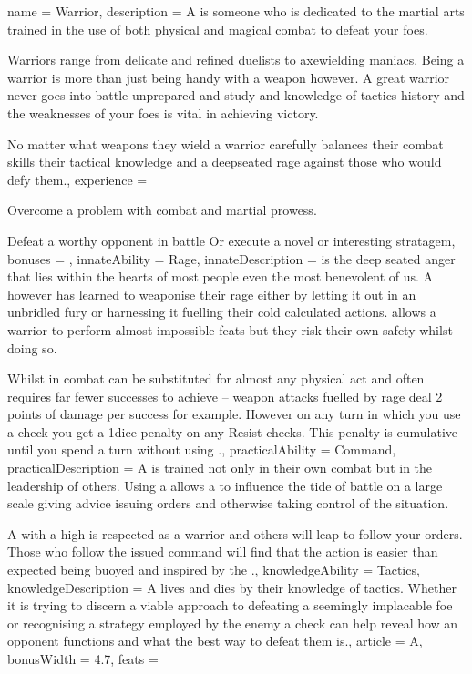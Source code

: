 \archetype
{
	name = Warrior,
	description = A \bname{} is someone who is dedicated to the martial arts\comma{} trained in the use of both physical and magical combat to defeat your foes. 

Warriors range from delicate and refined duelists\comma{} to axe\minus{}wielding maniacs. Being a warrior is more than just being handy with a weapon\comma{} however. A great warrior never goes into battle unprepared\comma{} and study and knowledge of tactics\comma{} history and the weaknesses of your foes is vital in achieving victory. 

No matter what weapons they wield\comma{} a warrior carefully balances their combat skills\comma{} their tactical knowledge and a deep\minus{}seated rage against those who would defy them.,
	experience = \item Overcome a problem with combat and martial prowess.
\item Defeat a worthy opponent in battle
Or execute a novel or interesting stratagem,
	bonuses = 
,
	innateAbility = Rage,
	innateDescription =  is the deep seated anger that lies within the hearts of most people\comma{} even the most benevolent of us. A \bname{}\comma{} however\comma{} has learned to weaponise their rage\comma{} either by letting it out in an unbridled fury\comma{} or harnessing it\comma{} fuelling their cold\comma{} calculated actions.  allows a warrior to perform almost impossible feats\comma{} but they risk their own safety whilst doing so.

Whilst in combat\comma{}  can be substituted for almost any physical act\comma{} and often requires far fewer successes to achieve – weapon attacks fuelled by rage deal 2 points of damage per success\comma{} for example. However\comma{} on any turn in which you use a  check\comma{} you get a 1\minus{}dice penalty on any Resist checks. This penalty is cumulative until you spend a turn without using .,
	practicalAbility = Command,
	practicalDescription = A \bname{} is trained not only in their own combat\comma{} but in the leadership of others. Using a  allows a \bname{} to influence the tide of battle on a large scale\comma{} giving advice\comma{} issuing orders and otherwise taking control of the situation. 

A \bname{} with a high  is respected as a warrior\comma{} and others will leap to follow your orders. Those who follow the issued command will find that the action is easier than expected\comma{} being buoyed and inspired by the .,
	knowledgeAbility = Tactics,
	knowledgeDescription = A \bname{} lives and dies by their knowledge of tactics. Whether it is trying to discern a viable approach to defeating a seemingly implacable foe\comma{} or recognising a strategy employed by the enemy\comma{} a  check can help reveal how an opponent functions\comma{} and what the best way to defeat them is.,
	article = A,
	bonusWidth = 4.7, feats = \WarriorFeats
}


